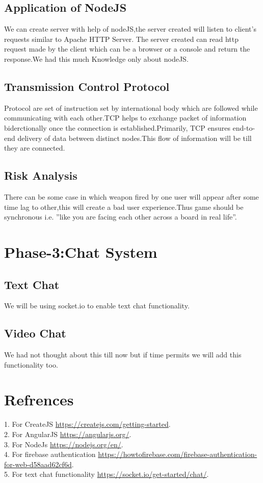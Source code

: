 \documentclass{scrreprt}
\begin{document}
\section{Application of NodeJS}
We can create server with help of nodeJS,the server created will listen to client's requests similar to Apache HTTP Server.	The server created can read http request made by the client which can be a browser or a console and return the response.We had this much Knowledge only about nodeJS.  

\section{Transmission Control Protocol}
Protocol are set of instruction set by international body which are followed while communicating with each other.TCP helps to exchange packet of information biderctionally once the connection is established.Primarily, TCP ensures end-to-end delivery of data between distinct nodes.This flow of information will be till they are connected.\\

\section{Risk Analysis}
There can be some case in which weapon fired by one user will appear after some time lag to other,this will create a bad user experience.Thus game should be synchronous i.e. ”like you are facing each other across a board in real life”.

\chapter{Phase-3:Chat System}
\section{Text Chat}
We will be using socket.io to enable text chat functionality.

\section{Video Chat}
We had not thought about this till now but if time permits we will add this functionality too.

\chapter{Refrences}
1. For CreateJS \url{https://createjs.com/getting-started}.\\
2. For AngularJS \url{https://angularjs.org/}.\\
3. For NodeJs \url{https://nodejs.org/en/}.\\
4. For firebase authentication \url{https://howtofirebase.com/firebase-authentication-for-web-d58aad62cf6d}.\\
5. For text chat functionality \url{https://socket.io/get-started/chat/}.\\

 
\end{document}

